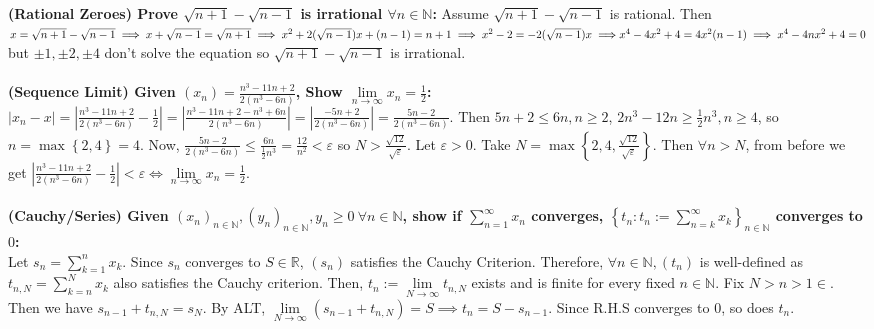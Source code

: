 \documentclass{letter}
\begin{document}
\textbf{(Rational Zeroes) Prove $\sqrt{n + 1} - \sqrt{n - 1}$ is
  irrational $\forall n \in \mathbb{N}$:} Assume $\sqrt{n + 1} -
\sqrt{n - 1}$ is rational. Then \\
$x = \sqrt{n + 1} - \sqrt{n - 1} \implies x + \sqrt{n - 1} = \sqrt{n +
  1} \implies x^2 + 2(\sqrt{n - 1})x + (n - 1) = n + 1 \implies x^2 -
2 = -2(\sqrt{n - 1})x \implies \\ x^4 - 4x^2 + 4 = 4x^2(n - 1)
\implies x^4 - 4nx^2 + 4 = 0$ but $\pm 1, \pm 2, \pm 4$ don't solve 
the equation so $\sqrt{n + 1} - \sqrt{n - 1}$ is irrational. \\ \\
\textbf{(Sequence Limit) Given $(x_n) = \frac{n^3 - 11n + 2}{2(n^3 -
    6n)}$, Show $\lim\limits_{n \to \infty} x_n = \frac{1}{2}$:} \\
$\left| x_n - x \right| = \left| \frac{n^3 - 11n + 2}{2(n^3 - 6n)} -
  \frac{1}{2} \right| = \left| \frac{n^3 - 11n + 2 - n^3 + 6n}{2(n^3 -
    6n)} \right| = \left| \frac{-5n + 2}{2(n^3 - 6n)} \right| =
\frac{5n - 2}{2(n^3 - 6n)}$. Then $5n + 2 \leq 6n, n \geq 2$, $2n^3 -
12n \geq \frac{1}{2}n^3, n \geq 4$, so $n = \max\left\{ 2, 4 \right\}
= 4$. Now, $\frac{5n - 2}{2(n^3 - 6n)} \leq \frac{6n}{\frac{1}{2}n^3}
= \frac{12}{n^2} < \varepsilon$ so $N >
\frac{\sqrt{12}}{\sqrt{\varepsilon}}$. Let $\varepsilon > 0$. Take $N 
= \max\left\{ 2, 4, \frac{\sqrt{12}}{\sqrt{\varepsilon}}
\right\}$. Then $\forall n > N$, from before we get $\left| \frac{n^3
- 11n + 2}{2(n^3 - 6n)} - \frac{1}{2} \right| < \varepsilon \iff
\lim\limits_{n \to \infty} x_n = \frac{1}{2}$. \\ \\
\textbf{(Cauchy/Series) Given $(x_n)_{n \in \mathbb{N}}, (y_n)_{n \in
    \mathbb{N}}, y_n \geq 0 \ \forall n \in \mathbb{N}$, show if
  $\sum\limits_{n = 1}^{\infty} x_n$ converges, $\left\{t_n : t_n :=
  \sum\limits_{n = k}^{\infty} x_k\right\}_{n \in \mathbb{N}}$ converges to $0$:} \\
Let $s_n = \sum\limits_{k = 1}^{n} x_k$. Since $s_n$ converges to $S
\in \mathbb{R}$, $(s_n)$ satisfies the Cauchy Criterion. Therefore,
$\forall n \in \mathbb{N}, (t_n)$ is well-defined as $t_{n, N} =
\sum\limits_{k = n}^{N} x_k$ also satisfies the Cauchy
criterion. Then, $t_n := \lim\limits_{N \to \infty} t_{n, N}$ exists
and is finite for every fixed $n \in \mathbb{N}$. Fix $N > n > 1
\in$. Then we have $s_{n - 1} + t_{n, N} = s_N$. By ALT,
$\lim\limits_{N \to \infty} (s_{n - 1} + t_{n, N}) = S \implies t_n =
S - s_{n - 1}$. Since R.H.S converges to $0$, so does $t_n$. \\ \\
\end{document}
